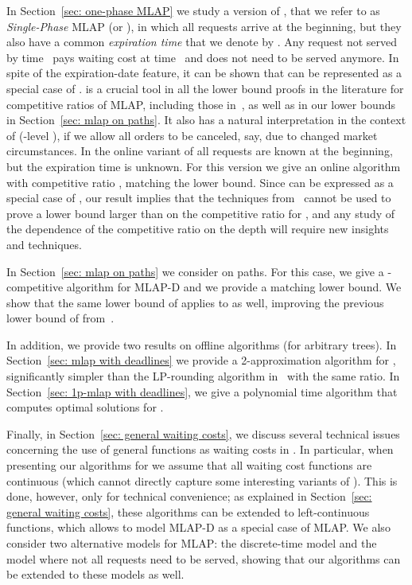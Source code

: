 \documentclass[a4paper]{article}
\newcommand{\MLAP}{\mbox{\rm\textsf{MLAP}}}
\newcommand{\MLAPD}{\mbox{\rm\textsf{MLAP-D}}}
\begin{document}
In Section~\ref{sec: one-phase MLAP} we study a version of
, that we refer to as \emph{Single-Phase} {\MLAP} (or
), in which all requests arrive at the beginning, but they
also have a common \emph{expiration time} that we denote by
.  Any request not served by time~ pays
waiting cost at time~ and does not need to be served
anymore. In spite of the expiration-date feature, it can be shown that
 can be represented as a special case of .  
 is a crucial tool in all the lower bound proofs in the literature
for competitive ratios of {\MLAP}, including those in~\cite{jrp-online-buchbinder,aggregation_wads_2013}, 
as well as in our lower bounds in Section~\ref{sec: mlap on paths}. 
It also has a natural interpretation in the context of  (-level ), if we
allow all orders to be canceled, say, due to changed market
circumstances.  In the online variant of  all requests are
known at the beginning, but the expiration time  is
unknown.  For this version we give an online algorithm with
competitive ratio , matching the lower bound.
Since  can be expressed as a special case of , our result
implies that the techniques
from~\cite{jrp-online-buchbinder,aggregation_wads_2013} cannot be used
to prove a lower bound larger than  on the competitive ratio for ,
and any study of the dependence of the competitive
ratio on the depth  will require new insights and techniques.

In Section~\ref{sec: mlap on paths} we consider  on paths.
For this case, we give a -competitive algorithm for {\MLAPD} and we provide
a matching lower bound.  We show that the same lower bound of  applies to 
 as well, improving the previous lower bound of 
from~\cite{aggregation_wads_2013}.

In addition, we provide two results on offline algorithms (for arbitrary trees).  
In Section~\ref{sec: mlap with deadlines} we provide a 2-approximation
algorithm for , significantly simpler than the LP-rounding
algorithm in~\cite{packet-aggregation-becchetti} with the same ratio.
In Section~\ref{sec: 1p-mlap with deadlines}, we give a polynomial
time algorithm that computes optimal solutions for .

Finally, in Section~\ref{sec: general waiting costs}, we discuss
several technical issues concerning the use of general functions as
waiting costs in . In particular, when presenting our algorithms for 
we assume that all waiting cost functions are continuous (which cannot directly capture some
interesting variants of ).
This is done, however, only for technical convenience; as explained in Section~\ref{sec: general waiting costs},
these algorithms can be extended to left-continuous
functions, which allows to model {\MLAPD} as a special case
of {\MLAP}. We also consider two alternative models for {\MLAP}: the
discrete-time model and the model where not all requests need to be
served, showing that our algorithms can be extended to these models as well.
\end{document}

